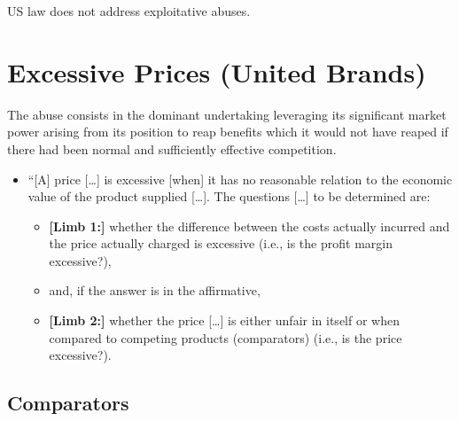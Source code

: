     US law does not address exploitative abuses.

\section{Excessive Prices (United Brands)}

    The abuse consists in the dominant undertaking leveraging its significant market power arising from its position to reap benefits which it would not have reaped if there had been normal and sufficiently effective competition.

    \begin{itemize}
        \item “[A] price […] is excessive [when] it has no reasonable relation to the economic value of the product supplied […]. The questions […] to be determined are:
        \begin{itemize}
            \item \textbf{[Limb 1:]} whether the difference between the costs actually incurred and the price actually charged is excessive (i.e., is the profit margin excessive?),
            \item and, if the answer is in the affirmative,
            \item \textbf{[Limb 2:]} whether the price […] is either unfair in itself or when compared to competing products (comparators) (i.e., is the price excessive?).
        \end{itemize}
    \end{itemize}

    \subsection{Comparators}

